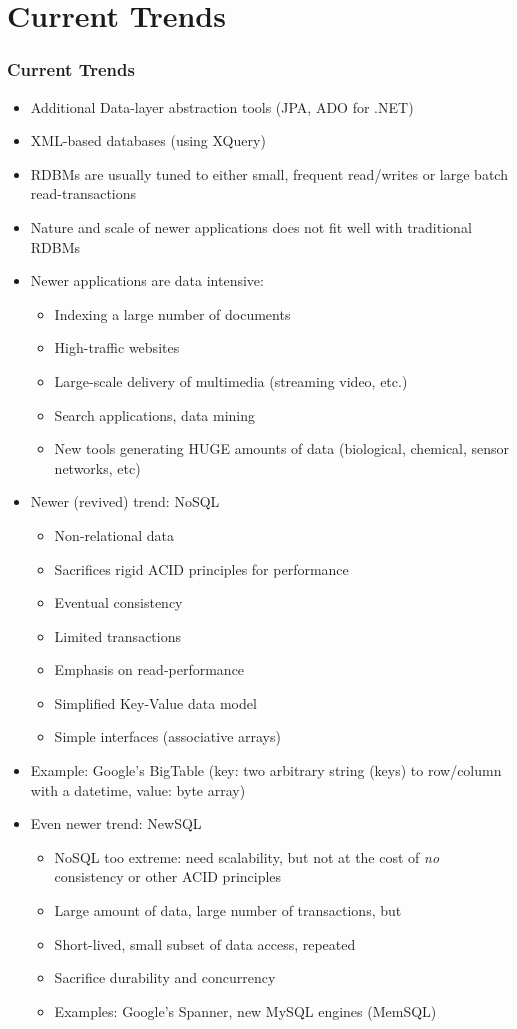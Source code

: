 \documentclass{beamer}
\begin{document}
\section{Current Trends}

\begin{frame}[allowframebreaks]
  \frametitle{Current Trends}

\begin{itemize}
  \item Additional Data-layer abstraction tools (JPA, ADO for .NET)
  \item XML-based databases (using XQuery)
  \item RDBMs are usually tuned to either small, frequent read/writes or large batch read-transactions
  \item Nature and scale of newer applications does not fit well with traditional RDBMs
  \item Newer applications are data intensive:
  \begin{itemize}
    \item Indexing a large number of documents
    \item High-traffic websites
    \item Large-scale delivery of multimedia (streaming video, etc.)
    \item Search applications, data mining
    \item New tools generating HUGE amounts of data (biological, chemical, sensor networks, etc)
  \end{itemize}
\framebreak
  \item Newer (revived) trend: NoSQL
  \begin{itemize}
    \item Non-relational data
    \item Sacrifices rigid ACID principles for performance
    \item Eventual consistency
    \item Limited transactions
    \item Emphasis on read-performance
    \item Simplified Key-Value data model
    \item Simple interfaces (associative arrays)
  \end{itemize}
  \item Example: Google's BigTable (key: two arbitrary string (keys) to row/column with a datetime, value: byte array)
\framebreak
  \item Even newer trend: NewSQL
  \begin{itemize}
    \item NoSQL too extreme: need scalability, but not at the cost of \emph{no} consistency or other ACID principles
    \item Large amount of data, large number of transactions, but 
    \item Short-lived, small subset of data access, repeated
    \item Sacrifice durability and concurrency
    \item Examples: Google's Spanner, new MySQL engines (MemSQL)
  \end{itemize}
\end{itemize}


\end{frame}
\end{document}
